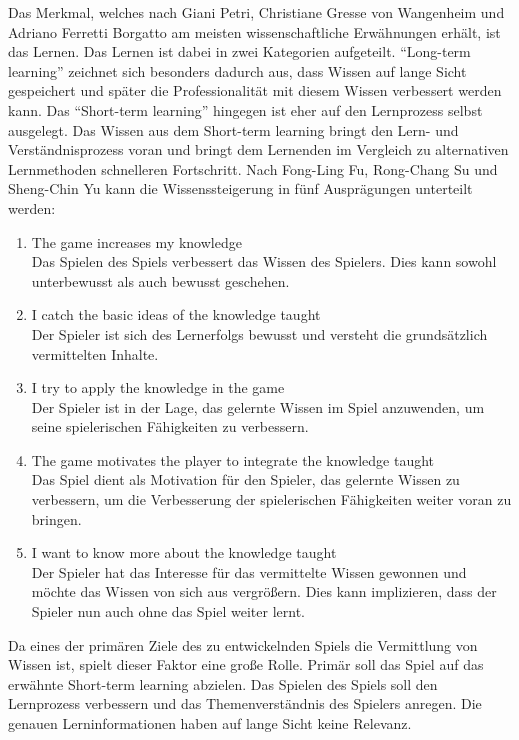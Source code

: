 	Das Merkmal, welches nach Giani Petri, Christiane Gresse von Wangenheim und Adriano Ferretti Borgatto am meisten wissenschaftliche Erwähnungen erhält, ist das Lernen. Das Lernen ist dabei in zwei Kategorien aufgeteilt. \enquote{Long-term learning} zeichnet sich besonders dadurch aus, dass Wissen auf lange Sicht gespeichert und später die Professionalität mit diesem Wissen verbessert werden kann. Das \enquote{Short-term learning} hingegen ist eher auf den Lernprozess selbst ausgelegt. Das Wissen aus dem Short-term learning bringt den Lern- und Verständnisprozess voran und bringt dem Lernenden im Vergleich zu alternativen Lernmethoden schnelleren Fortschritt. Nach Fong-Ling Fu, Rong-Chang Su und Sheng-Chin Yu kann die Wissenssteigerung in fünf Ausprägungen unterteilt werden:
	\begin{enumerate}
		\item{The game increases my knowledge} \hfill \\
		Das Spielen des Spiels verbessert das Wissen des Spielers. Dies kann sowohl unterbewusst als auch bewusst geschehen.
		\item{I catch the basic ideas of the knowledge taught} \hfill \\
		Der Spieler ist sich des Lernerfolgs bewusst und versteht die grundsätzlich vermittelten Inhalte.
		\item{I try to apply the knowledge in the game}\hfill \\
		Der Spieler ist in der Lage, das gelernte Wissen im Spiel anzuwenden, um seine spielerischen Fähigkeiten zu verbessern.
		\item{The game motivates the player to integrate the knowledge taught}\hfill \\
		Das Spiel dient als Motivation für den Spieler, das gelernte Wissen zu verbessern, um die Verbesserung der spielerischen Fähigkeiten weiter voran zu bringen.
		\item{I want to know more about the knowledge taught}\hfill \\
		Der Spieler hat das Interesse für das vermittelte Wissen gewonnen und möchte das Wissen von sich aus vergrößern. Dies kann implizieren, dass der Spieler nun auch ohne das Spiel weiter lernt.
	\end{enumerate}
	Da eines der primären Ziele des zu entwickelnden Spiels die Vermittlung von Wissen ist, spielt dieser Faktor eine große Rolle. Primär soll das Spiel auf das erwähnte Short-term learning abzielen. Das Spielen des Spiels soll den Lernprozess verbessern und das Themenverständnis des Spielers anregen. Die genauen Lerninformationen haben auf lange Sicht keine Relevanz.

